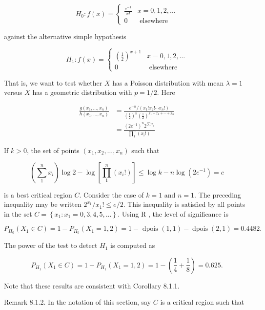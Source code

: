 $$
H_{0}: f(x)= \begin{cases}\frac{e^{-1}}{x!} & x=0,1,2, \ldots \\ 0 & \text { elsewhere }\end{cases}
$$

against the alternative simple hypothesis

$$
H_{1}: f(x)= \begin{cases}\left(\frac{1}{2}\right)^{x+1} & x=0,1,2, \ldots \\ 0 & \text { elsewhere }\end{cases}
$$

That is, we want to test whether $X$ has a Poisson distribution with mean $\lambda=1$ versus $X$ has a geometric distribution with $p=1 / 2$. Here

$$
\begin{aligned}
\frac{g\left(x_{1}, \ldots, x_{n}\right)}{h\left(x_{1}, \ldots, x_{n}\right)} & =\frac{e^{-n} /\left(x_{1}!x_{2}!\cdots x_{n}!\right)}{\left(\frac{1}{2}\right)^{n}\left(\frac{1}{2}\right)^{x_{1}+x_{2}+\cdots+x_{n}}} \\
& =\frac{\left(2 e^{-1}\right)^{n} 2^{\sum x_{i}}}{\prod_{1}^{n}\left(x_{i}!\right)}
\end{aligned}
$$

If $k>0$, the set of points $\left(x_{1}, x_{2}, \ldots, x_{n}\right)$ such that

$$
\left(\sum_{1}^{n} x_{i}\right) \log 2-\log \left[\prod_{1}^{n}\left(x_{i}!\right)\right] \leq \log k-n \log \left(2 e^{-1}\right)=c
$$

is a best critical region $C$. Consider the case of $k=1$ and $n=1$. The preceding inequality may be written $2^{x_{1}} / x_{1}!\leq e / 2$. This inequality is satisfied by all points in the set $C=\left\{x_{1}: x_{1}=0,3,4,5, \ldots\right\}$. Using R , the level of significance is

$$
P_{H_{0}}\left(X_{1} \in C\right)=1-P_{H_{0}}\left(X_{1}=1,2\right)=1-\text { dpois }(1,1)-\operatorname{dpois}(2,1)=0.4482 .
$$

The power of the test to detect $H_{1}$ is computed as

$$
P_{H_{1}}\left(X_{1} \in C\right)=1-P_{H_{1}}\left(X_{1}=1,2\right)=1-\left(\frac{1}{4}+\frac{1}{8}\right)=0.625 .
$$

Note that these results are consistent with Corollary 8.1.1.

Remark 8.1.2. In the notation of this section, say $C$ is a critical region such that

